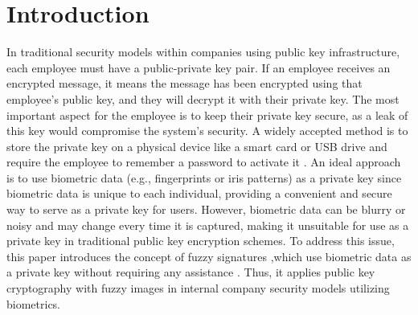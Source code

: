 \documentclass[graybox]{svmult}
\begin{document}

\section{Introduction}
In traditional security models within companies using public key infrastructure, each employee must have a public-private key pair. If an employee receives an \allowbreak encrypted message, it means the message has been encrypted using that employee's public key, and they will decrypt it with their private key. The most important \allowbreak aspect for the employee is to keep their private key secure, as a leak of this key would compromise the system's security. A widely accepted method is to store the private key on a physical device like a smart card or USB drive and require the employee to remember a password to activate it
\parencite{Ellison2000}.
An ideal approach is to use biometric data (e.g., fingerprints or iris patterns)
\parencite{Connaughton2007}
as a private key since biometric data is unique to each individual, providing a \allowbreak convenient and secure way to serve as a private key for users. However, biometric data can be blurry or noisy and may change every time it is captured, making it unsuitable for use as a private key in traditional public key encryption schemes.
To address this issue, this paper introduces the concept of fuzzy signatures
\parencite{Takahashi2015}
,which use \allowbreak biometric data as a private key without requiring any assistance
\parencite{Dodis2008}
. Thus, it applies public key cryptography with fuzzy images
\parencite{Son2016}
in internal company security models utilizing biometrics.
\end{document}
